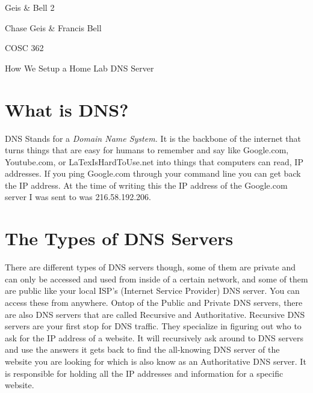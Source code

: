 \documentclass{article} %
\begin{document}


\noindent 

\noindent 

\noindent 

\noindent 

\noindent Geis \& Bell 2

\noindent 

\noindent Chase Geis \& Francis Bell 

\noindent COSC 362

\noindent 

\noindent How We Setup a Home Lab DNS Server

\noindent 

\noindent 
\section{What is DNS?}

\noindent 

\noindent DNS Stands for a \textit{Domain Name System. }It is the backbone of the internet that turns things that are easy for humans to remember and say like Google.com, Youtube.com, or LaTexIsHardToUse.net into things that computers can read, IP addresses. If you ping Google.com through your command line you can get back the IP address. At the time of writing this the IP address of the Google.com server I was sent to was 216.58.192.206.

\noindent 

\noindent 
\section{The Types of DNS Servers }

\noindent 

\noindent There are different types of DNS servers though, some of them are private and can only be accessed and used from inside of a certain network, and some of them are public like your local ISP's (Internet Service Provider) DNS server. You can access these from anywhere. Ontop of the Public and Private DNS servers, there are also DNS servers that are called Recursive and Authoritative. Recursive DNS servers are your first stop for DNS traffic. They specialize in figuring out who to ask for the IP address of a website. It will recursively ask around to DNS servers and use the answers it gets back to find the all-knowing DNS server of the website you are looking for which is also know as an Authoritative DNS server. It is responsible for holding all the IP addresses and information for a specific website.
\end{document}

